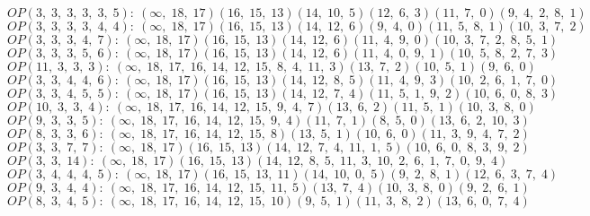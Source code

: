 $OP(3, \;3, \;3, \;3, \;3, \;5): \:(\infty, \;18, \;17)(16, \;15, \;13)(14, \;10, \;5)(12, \;6, \;3)(11, \;7, \;0)(9, \;4, \;2, \;8, \;1)$\\
$OP(3, \;3, \;3, \;3, \;4, \;4): \:(\infty, \;18, \;17)(16, \;15, \;13)(14, \;12, \;6)(9, \;4, \;0)(11, \;5, \;8, \;1)(10, \;3, \;7, \;2)$\\
$OP(3, \;3, \;3, \;4, \;7): \:(\infty, \;18, \;17)(16, \;15, \;13)(14, \;12, \;6)(11, \;4, \;9, \;0)(10, \;3, \;7, \;2, \;8, \;5, \;1)$\\
$OP(3, \;3, \;3, \;5, \;6): \:(\infty, \;18, \;17)(16, \;15, \;13)(14, \;12, \;6)(11, \;4, \;0, \;9, \;1)(10, \;5, \;8, \;2, \;7, \;3)$\\
$OP(11, \;3, \;3, \;3): \:(\infty, \;18, \;17, \;16, \;14, \;12, \;15, \;8, \;4, \;11, \;3)(13, \;7, \;2)(10, \;5, \;1)(9, \;6, \;0)$\\
$OP(3, \;3, \;4, \;4, \;6): \:(\infty, \;18, \;17)(16, \;15, \;13)(14, \;12, \;8, \;5)(11, \;4, \;9, \;3)(10, \;2, \;6, \;1, \;7, \;0)$\\
$OP(3, \;3, \;4, \;5, \;5): \:(\infty, \;18, \;17)(16, \;15, \;13)(14, \;12, \;7, \;4)(11, \;5, \;1, \;9, \;2)(10, \;6, \;0, \;8, \;3)$\\
$OP(10, \;3, \;3, \;4): \:(\infty, \;18, \;17, \;16, \;14, \;12, \;15, \;9, \;4, \;7)(13, \;6, \;2)(11, \;5, \;1)(10, \;3, \;8, \;0)$\\
$OP(9, \;3, \;3, \;5): \:(\infty, \;18, \;17, \;16, \;14, \;12, \;15, \;9, \;4)(11, \;7, \;1)(8, \;5, \;0)(13, \;6, \;2, \;10, \;3)$\\
$OP(8, \;3, \;3, \;6): \:(\infty, \;18, \;17, \;16, \;14, \;12, \;15, \;8)(13, \;5, \;1)(10, \;6, \;0)(11, \;3, \;9, \;4, \;7, \;2)$\\
$OP(3, \;3, \;7, \;7): \:(\infty, \;18, \;17)(16, \;15, \;13)(14, \;12, \;7, \;4, \;11, \;1, \;5)(10, \;6, \;0, \;8, \;3, \;9, \;2)$\\
$OP(3, \;3, \;14): \:(\infty, \;18, \;17)(16, \;15, \;13)(14, \;12, \;8, \;5, \;11, \;3, \;10, \;2, \;6, \;1, \;7, \;0, \;9, \;4)$\\
$OP(3, \;4, \;4, \;4, \;5): \:(\infty, \;18, \;17)(16, \;15, \;13, \;11)(14, \;10, \;0, \;5)(9, \;2, \;8, \;1)(12, \;6, \;3, \;7, \;4)$\\
$OP(9, \;3, \;4, \;4): \:(\infty, \;18, \;17, \;16, \;14, \;12, \;15, \;11, \;5)(13, \;7, \;4)(10, \;3, \;8, \;0)(9, \;2, \;6, \;1)$\\
$OP(8, \;3, \;4, \;5): \:(\infty, \;18, \;17, \;16, \;14, \;12, \;15, \;10)(9, \;5, \;1)(11, \;3, \;8, \;2)(13, \;6, \;0, \;7, \;4)$\\
